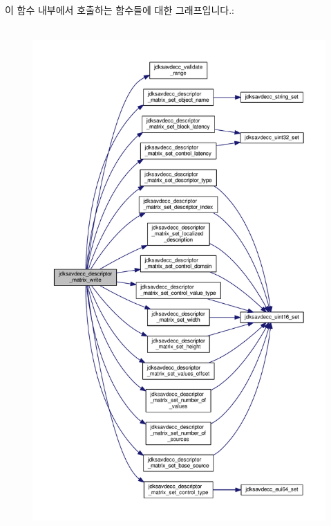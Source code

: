 이 함수 내부에서 호출하는 함수들에 대한 그래프입니다.\+:
\nopagebreak
\begin{figure}[H]
\begin{center}
\leavevmode
\includegraphics[height=550pt]{group__descriptor__matrix_ga8388b6f549fd0b381bc081e641bd4e5e_cgraph}
\end{center}
\end{figure}



